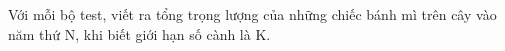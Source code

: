 Với mỗi bộ test, viết ra tổng trọng lượng của những chiếc bánh mì trên cây vào năm thứ N, khi biết giới hạn số cành là K.  

\